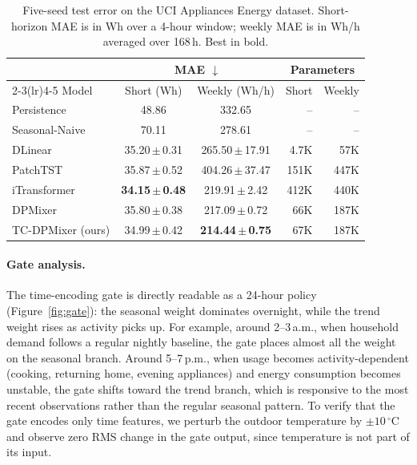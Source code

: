 \documentclass{article}
\begin{document}
\begin{table}[h]
  \centering
  \small
  \caption{Five-seed test error on the UCI Appliances Energy dataset.
    Short-horizon MAE is in Wh over a 4-hour window; weekly MAE is in
    Wh/h averaged over 168\,h. Best in bold.}
  \label{tab:headline}
  \begin{tabular}{lccrr}
    \toprule
                       & \multicolumn{2}{c}{MAE $\downarrow$} & \multicolumn{2}{c}{Parameters} \\
    \cmidrule(lr){2-3}\cmidrule(lr){4-5}
    Model & Short (Wh) & Weekly (Wh/h) & Short & Weekly \\
    \midrule
    Persistence        & 48.86               & 332.65              & --    & --    \\
    Seasonal-Naive     & 70.11               & 278.61              & --    & --    \\
    DLinear            & 35.20\,$\pm$\,0.31  & 265.50\,$\pm$\,17.91 & 4.7K  & 57K   \\
    PatchTST           & 35.87\,$\pm$\,0.52  & 404.26\,$\pm$\,37.47 & 151K  & 447K  \\
    iTransformer       & \textbf{34.15\,$\pm$\,0.48} & 219.91\,$\pm$\,2.42 & 412K  & 440K  \\
    DPMixer            & 35.80\,$\pm$\,0.38  & 217.09\,$\pm$\,0.72 & 66K   & 187K  \\
    TC-DPMixer (ours)  & 34.99\,$\pm$\,0.42  & \textbf{214.44\,$\pm$\,0.75} & 67K & 187K  \\
    \bottomrule
  \end{tabular}
\end{table}

\paragraph{Gate analysis.}
The time-encoding gate is directly readable as a 24-hour policy
(Figure~\ref{fig:gate}): the seasonal weight dominates overnight,
while the trend weight rises as activity picks up. For example,
around 2--3\,a.m., when household demand follows a regular nightly
baseline, the gate places almost all the weight on the seasonal
branch. Around 5--7\,p.m., when usage becomes activity-dependent
(cooking, returning home, evening appliances) and energy
consumption becomes unstable, the gate shifts toward the trend
branch, which is responsive to the most recent observations rather
than the regular seasonal pattern. To verify that the gate encodes
only time features, we perturb the outdoor temperature by
$\pm 10\,^{\circ}$C and observe zero RMS change in the gate output,
since temperature is not part of its input.
\end{document}
